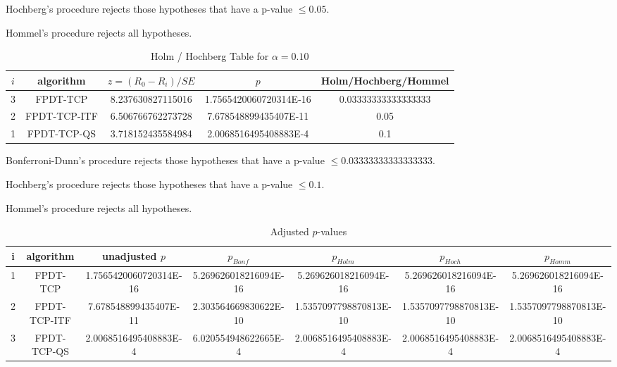 \documentclass[a4paper,10pt]{article}
\begin{document}
\begin{landscape}
Hochberg's procedure rejects those hypotheses that have a p-value $\le0.05$.


Hommel's procedure rejects all hypotheses.


\begin{table}[!htp]
\centering\tiny
\caption{Holm / Hochberg Table for $\alpha=0.10$}
\begin{tabular}{ccccc}
$i$&algorithm&$z=(R_0 - R_i)/SE$&$p$&Holm/Hochberg/Hommel\\
\hline
3&FPDT-TCP&8.237630827115016&1.7565420060720314E-16&0.03333333333333333\\
2&FPDT-TCP-ITF&6.506766762273728&7.678548899435407E-11&0.05\\
1&FPDT-TCP-QS&3.718152435584984&2.0068516495408883E-4&0.1\\
\hline
\end{tabular}
\end{table}
Bonferroni-Dunn's procedure rejects those hypotheses that have a p-value $\le0.03333333333333333$.


Hochberg's procedure rejects those hypotheses that have a p-value $\le0.1$.


Hommel's procedure rejects all hypotheses.


\begin{table}[!htp]
\centering\tiny
\caption{Adjusted $p$-values}
\begin{tabular}{ccccccc}
i&algorithm&unadjusted $p$&$p_{Bonf}$&$p_{Holm}$&$p_{Hoch}$&$p_{Homm}$\\
\hline
1&FPDT-TCP&1.7565420060720314E-16&5.269626018216094E-16&5.269626018216094E-16&5.269626018216094E-16&5.269626018216094E-16\\
2&FPDT-TCP-ITF&7.678548899435407E-11&2.303564669830622E-10&1.5357097798870813E-10&1.5357097798870813E-10&1.5357097798870813E-10\\
3&FPDT-TCP-QS&2.0068516495408883E-4&6.020554948622665E-4&2.0068516495408883E-4&2.0068516495408883E-4&2.0068516495408883E-4\\
\hline
\end{tabular}
\end{table}


\end{landscape}
\end{document}
